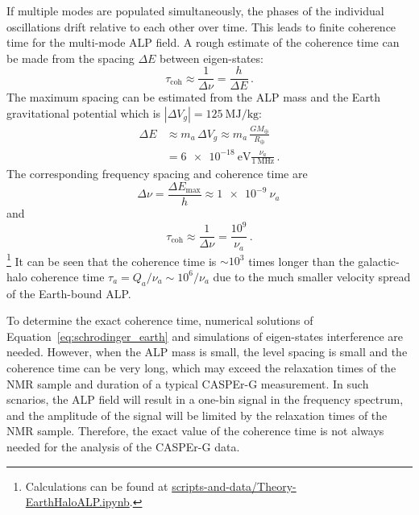 If multiple modes are populated simultaneously, the phases of the individual oscillations drift relative to each other over time. 
This leads to finite coherence time for the multi-mode ALP field. 
A rough estimate of the coherence time can be made from the spacing $\Delta E$ between eigen-states:
\begin{equation}
    \tau_\mathrm{coh} \approx \frac{1}{\Delta \nu} = \frac{h}{\Delta E}
    \,.\label{eq:coherence_time_estimate}
\end{equation}
The maximum spacing can be estimated from the ALP mass and the Earth gravitational potential which is $|\Delta V_g| = \SI{125}{\mega\joule\per\kg}$:
\begin{align}
    \Delta E &\approx m_a\,\Delta V_g \approx m_a\,\frac{G M_\oplus}{R_\oplus}\\
    & = \SI{6e-18}{\eV}\frac{\nu_a}{\SI{1}{\mega\hertz}}
    \,.\label{eq:coherence_time_estimate_max}
\end{align}
The corresponding frequency spacing and coherence time are
\begin{equation}
    \Delta\nu = \frac{\Delta E_\mathrm{max}}{h} \approx \SI{1e-9}{}\nu_a
    \,\label{eq:coherence_time_estimate_max_freq}
\end{equation}
and
\begin{equation}
    \tau_\mathrm{coh} \approx \frac{1}{\Delta\nu} = \frac{10^9}{\nu_a}
    \,.\label{eq:coherence_time_estimate_max_value}
\end{equation}
\footnote{Calculations can be found at \url{scripts-and-data/Theory-EarthHaloALP.ipynb}.}
It can be seen that the coherence time is $\sim 10^3$ times longer than the galactic-halo coherence time $\tau_a = Q_a/\nu_a \sim 10^6/\nu_a$ due to the much smaller velocity spread of the Earth-bound ALP. 

To determine the exact coherence time, numerical solutions of Equation~\eqref{eq:schrodinger_earth} and simulations of eigen-states interference are needed. 
However, when the ALP mass is small, the level spacing is small and the coherence time can be very long, which may exceed the relaxation times of the NMR sample and duration of a typical CASPEr-G measurement. 
In such scnarios, the ALP field will result in a one-bin signal in the frequency spectrum, and the amplitude of the signal will be limited by the relaxation times of the NMR sample. 
Therefore, the exact value of the coherence time is not always needed for the analysis of the CASPEr-G data. 


